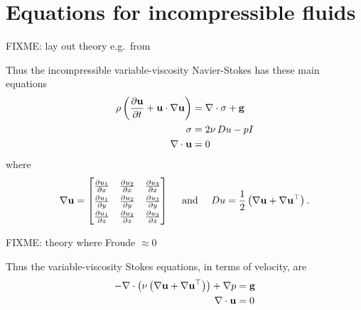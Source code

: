 
\section{Equations for incompressible fluids}

FIXME: lay out theory e.g.~from \citep{Acheson1990,Ockendonetal2003}

Thus the incompressible variable-viscosity Navier-Stokes has these main equations
\begin{align}
\rho \left(\frac{\partial \mathbf{u}}{\partial t} + \mathbf{u} \cdot \nabla \mathbf{u}\right) &= \nabla\cdot \sigma + \mathbf{g} \label{stokesgeneralconserve} \\
\sigma &= 2 \nu\, Du - p I \label{stokesgenerallaw} \\
\nabla\cdot \mathbf{u} &= 0 \label{stokesgeneralincomp}
\end{align}
where
  $$\grad \bu = \renewcommand{\arraystretch}{1.3}\begin{bmatrix}
    \frac{\partial u_1}{\partial x} & \frac{\partial u_2}{\partial x} & \frac{\partial u_3}{\partial x} \\
    \frac{\partial u_1}{\partial y} & \frac{\partial u_2}{\partial y} & \frac{\partial u_3}{\partial y} \\
    \frac{\partial u_1}{\partial z} & \frac{\partial u_2}{\partial z} & \frac{\partial u_3}{\partial z}
    \end{bmatrix}
    \quad \text{ and } \quad
    D u = \frac{1}{2} \left(\grad \bu + \grad \bu^{\top}\right).$$

FIXME: theory where Froude $\approx 0$

Thus the variable-viscosity Stokes equations, in terms of velocity, are
\begin{align*}
- \nabla\cdot \left(\nu \left(\nabla \mathbf{u} + \nabla \mathbf{u}^{\top}\right)\right) + \nabla p &= \mathbf{g} \\
\nabla\cdot \mathbf{u} &= 0
\end{align*}

